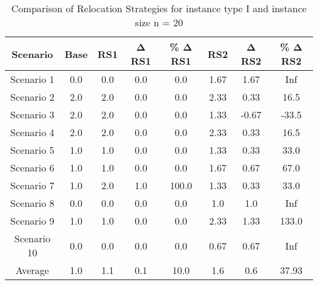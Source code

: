 \begin{table}[H]
\centering
\begin{tabular}{cccccccc}
  \hline
  \textbf{Scenario} & \textbf{Base} & \textbf{RS1} & \textbf{Δ RS1} & \textbf{\% Δ RS1} & \textbf{RS2} & \textbf{Δ RS2} & \textbf{\% Δ RS2} \\\hline
  Scenario 1 & 0.0 & 0.0 & 0.0 & 0.0 & 1.67 & 1.67 & Inf \\
  Scenario 2 & 2.0 & 2.0 & 0.0 & 0.0 & 2.33 & 0.33 & 16.5 \\
  Scenario 3 & 2.0 & 2.0 & 0.0 & 0.0 & 1.33 & -0.67 & -33.5 \\
  Scenario 4 & 2.0 & 2.0 & 0.0 & 0.0 & 2.33 & 0.33 & 16.5 \\
  Scenario 5 & 1.0 & 1.0 & 0.0 & 0.0 & 1.33 & 0.33 & 33.0 \\
  Scenario 6 & 1.0 & 1.0 & 0.0 & 0.0 & 1.67 & 0.67 & 67.0 \\
  Scenario 7 & 1.0 & 2.0 & 1.0 & 100.0 & 1.33 & 0.33 & 33.0 \\
  Scenario 8 & 0.0 & 0.0 & 0.0 & 0.0 & 1.0 & 1.0 & Inf \\
  Scenario 9 & 1.0 & 1.0 & 0.0 & 0.0 & 2.33 & 1.33 & 133.0 \\
  Scenario 10 & 0.0 & 0.0 & 0.0 & 0.0 & 0.67 & 0.67 & Inf \\
  Average & 1.0 & 1.1 & 0.1 & 10.0 & 1.6 & 0.6 & 37.93 \\\hline
\end{tabular}
\caption{Comparison of Relocation Strategies for instance type I and instance size n = 20}
\label{tab:wait:resrelocation-comparison_I_20}
\end{table}
